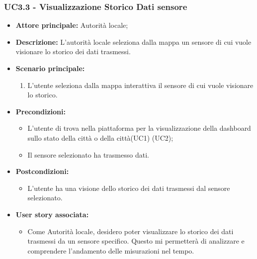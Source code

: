 \subsubsection{UC3.3 - Visualizzazione Storico Dati sensore}
\begin{itemize}
    \item \textbf{Attore principale:} Autorità locale;
    \item \textbf{Descrizione:} L’autorità locale seleziona dalla mappa un sensore di cui vuole visionare lo storico dei dati trasmessi.
    \item \textbf{Scenario principale:}
          \begin{enumerate}
              \item L'utente seleziona dalla mappa interattiva il sensore di cui vuole visionare lo storico.
          \end{enumerate}
    \item \textbf{Precondizioni:}
          \begin{itemize}
              \item  L'utente di trova  nella piattaforma per la visualizzazione della dashboard sullo stato della città o della città(UC1) (UC2);
              \item Il sensore selezionato ha trasmesso dati.
          \end{itemize}
    \item \textbf{Postcondizioni:}
          \begin{itemize}
              \item  L'utente ha una visione dello storico dei dati trasmessi dal sensore selezionato.
          \end{itemize}
    \item \textbf{User story associata:}
          \begin{itemize}
              \item Come Autorità locale, desidero poter visualizzare lo storico dei dati trasmessi da un sensore specifico. Questo mi permetterà di analizzare e comprendere l'andamento delle misurazioni nel tempo.
          \end{itemize}
\end{itemize}